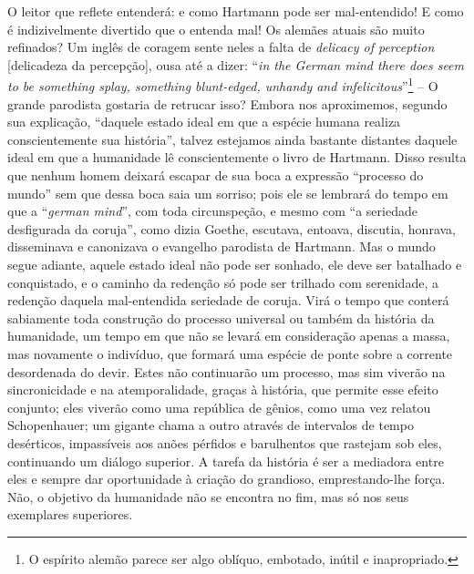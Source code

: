 \begin{enumerate}
\begin{enumerate}
    O leitor que reflete entenderá: e como Hartmann pode ser
    mal-entendido! E como é indizivelmente divertido que o entenda mal!
    Os alemães atuais são muito refinados? Um inglês de coragem sente
    neles a falta de \emph{delicacy of perception} {[}delicadeza da
    percepção{]}, ousa até a dizer: ``\emph{in the German mind there
    does seem to be something splay, something blunt-edged, unhandy and
    infelicitous}''\footnote{O espírito alemão parece ser algo oblíquo,
      embotado, inútil e inapropriado.} -- O grande parodista gostaria
    de retrucar isso? Embora nos aproximemos, segundo sua explicação,
    ``daquele estado ideal em que a espécie humana realiza
    conscientemente sua história'', talvez estejamos ainda bastante
    distantes daquele ideal em que a humanidade lê conscientemente o
    livro de Hartmann. Disso resulta que nenhum homem deixará escapar de
    sua boca a expressão ``processo do mundo'' sem que dessa boca saia
    um sorriso; pois ele se lembrará do tempo em que a ``\emph{german
    mind}'', com toda circunspeção, e mesmo com ``a seriedade
    desfigurada da coruja'', como dizia Goethe, escutava, entoava,
    discutia, honrava, disseminava e canonizava o evangelho parodista de
    Hartmann. Mas o mundo segue adiante, aquele estado ideal não pode
    ser sonhado, ele deve ser batalhado e conquistado, e o caminho da
    redenção só pode ser trilhado com serenidade, a redenção daquela
    mal-entendida seriedade de coruja. Virá o tempo que conterá
    sabiamente toda construção do processo universal ou também da
    história da humanidade, um tempo em que não se levará em
    consideração apenas a massa, mas novamente o indivíduo, que formará
    uma espécie de ponte sobre a corrente desordenada do devir. Estes
    não continuarão um processo, mas sim viverão na sincronicidade e na
    atemporalidade, graças à história, que permite esse efeito conjunto;
    eles viverão como uma república de gênios, como uma vez relatou
    Schopenhauer; um gigante chama a outro através de intervalos de
    tempo desérticos, impassíveis aos anões pérfidos e barulhentos que
    rastejam sob eles, continuando um diálogo superior. A tarefa da
    história é ser a mediadora entre eles e sempre dar oportunidade à
    criação do grandioso, emprestando-lhe força. Não, o objetivo da
    humanidade não se encontra no fim, mas só nos seus exemplares
    superiores.


\end{enumerate}
\end{enumerate}
